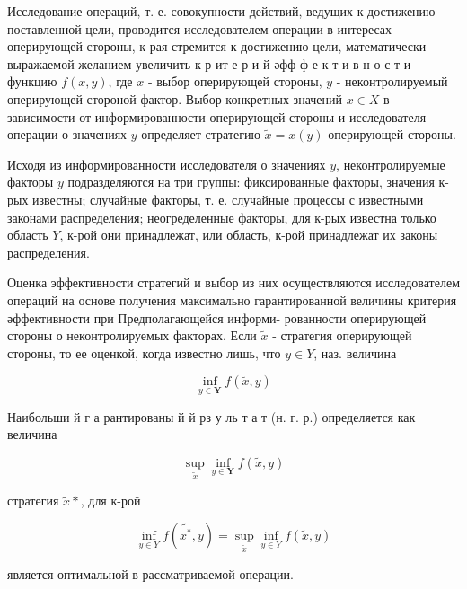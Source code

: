 \documentclass[10pt]{article}
\begin{document}
Исследование операций, т. е. совокупности действий, ведущих к достижению поставленной цели, проводится исследователем операции в интересах оперирующей стороны, к-рая стремится к достижению цели, математически выражаемой желанием увеличить к р ит е р и й әфф ф е к т и в н о с т и - функцию $f(x, y)$, где $x$ - выбор оперирующей стороны, $y$ - неконтролируемый оперирующей стороной фактор. Выбор конкретных значений $x \in X$ в зависимости от информированности оперирующей стороны и исследователя операции о значениях $y$ определяет стратегию $\tilde{x}=x(y)$ оперирующей стороны.



Исходя из информированности исследователя о значениях $y$, неконтролируемые факторы $y$ подразделяются на три группы: фиксированные факторы, значения к-рых известны; случайные факторы, т. е. случайные процессы с известными законами распределения; неогределенные факторы, для к-рых известна только область $Y$, к-рой они принадлежат, или область, к-рой принадлежат их законы распределения.



Оценка эффективности стратегий и выбор из них осуществляются исследователем операций на основе получения максимально гарантированной величины критерия әффективности при Предполагающейся информи- рованности оперирующей стороны о неконтролируемых факторах. Если $\tilde{x}$ - стратегия оперирующей стороны, то ее оценкой, когда известно лишь, что $y \in Y$, наз. величина



\[

\inf _{y \in \boldsymbol{Y}} f(\tilde{x}, y)

\]



Наибольши й г а рантированы й й рз у ль т а т (н. г. р.) определяется как величина



\[

\sup _{\tilde{x}} \inf _{y \in \boldsymbol{Y}} f(\tilde{x}, y)

\]



стратегия $\tilde{x} *$, для к-рой



\[

\inf _{y \in Y} f\left(\tilde{x^{*}}, y\right)=\sup _{\tilde{x}} \inf _{y \in Y} f(\tilde{x}, y)

\]



является оптимальной в рассматриваемой операции.
\end{document}
